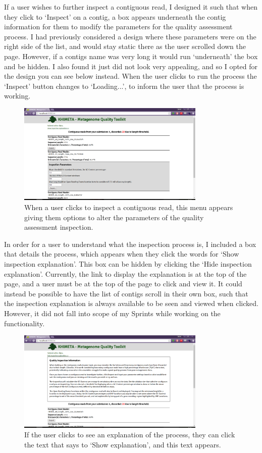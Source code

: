 If a user wishes to further inspect a contiguous read, I designed it such that when they click to `Inspect' on a contig, a box appears underneath the contig information for them to modify the parameters for the quality assessment process. I had previously considered a design where these parameters were on the right side of the list, and would stay static there as the user scrolled down the page. However, if a contigs name was very long it would run `underneath' the box and be hidden. I also found it just did not look very appealing, and so I opted for the design you can see below instead. When the user clicks to run the process the `Inspect' button changes to `Loading...', to inform the user that the process is working.

\begin{figure}[H]
	\centering
\includegraphics[width=0.8\textwidth]{images/ui3}
\caption{When a user clicks to inspect a contiguous read, this menu appears giving them options to alter the parameters of the quality assessment inspection.}
\end{figure}

In order for a user to understand what the inspection process is, I included a box that details the process, which appears when they click the words for `Show inspection explanation'. This box can be hidden by clicking the `Hide inspection explanation'. Currently, the link to display the explanation is at the top of the page, and a user must be at the top of the page to click and view it. It could instead be possible to have the list of contigs scroll in their own box, such that the inspection explanation is always available to be seen and viewed when clicked. However, it did not fall into scope of my Sprints while working on the functionality.

\begin{figure}[H]
	\centering
\includegraphics[width=0.8\textwidth]{images/ui4}
\caption{If the user clicks to see an explanation of the process, they can click the text that says to `Show explanation', and this text appears.}
\end{figure}

